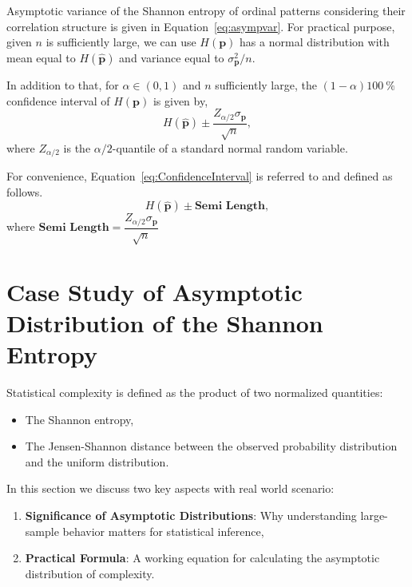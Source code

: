 Asymptotic variance of the Shannon entropy of ordinal patterns considering their correlation structure is given in Equation~\ref{eq:asympvar}.
For practical purpose, given $n$ is sufficiently large, we can use $H(\mathbf{p})$ has a normal distribution with mean equal to $H(\widehat{\mathbf{p}})$ and variance equal to $\sigma^2_{\mathbf{p}}/n$. 

In addition to that, for $\alpha\in(0,1)$ and $n$ sufficiently large, the $(1-\alpha)\SI{100}{\percent}$ confidence interval of $H(\mathbf{p})$ is given by, 
\begin{equation}
  H(\widehat{\mathbf{p}})\pm \dfrac{Z_{\alpha/2}\sigma_{\mathbf{p}}}{\sqrt{n}},
  \label{eq:ConfidenceInterval}
\end{equation} 
where $Z_{\alpha/2}$ is the $\alpha/2$-quantile of a standard normal random variable.

For convenience, Equation~\ref{eq:ConfidenceInterval} is referred to and defined as follows.
\begin{equation}
	H(\widehat{\mathbf{p}})\pm \textbf{Semi Length},
	\label{eq:CI}
\end{equation} 
where $\textbf{Semi Length}=\dfrac{Z_{\alpha/2}\sigma_{\mathbf{p}}}{\sqrt{n}}$

\section{Case Study of Asymptotic Distribution of the Shannon Entropy} \label{Sec:CaseStudy} 

Statistical complexity is defined as the product of two normalized quantities:
\begin{itemize}
	\item The Shannon entropy,
	\item The Jensen-Shannon distance between the observed probability distribution and the uniform distribution. 
\end{itemize}

In this section we discuss two key aspects with real world scenario:
\begin{enumerate}
	\item \textbf{Significance of Asymptotic Distributions}: Why understanding large-sample behavior matters for statistical inference,
	\item \textbf{Practical Formula}: A working equation for calculating the asymptotic distribution of complexity.
\end{enumerate}

